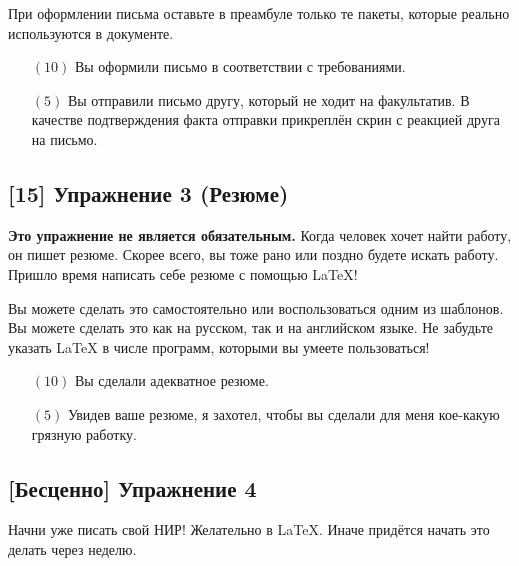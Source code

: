 \documentclass[12pt, a4paper, oneside]{article}
\begin{document}
При оформлении письма оставьте в преамбуле только те пакеты, которые реально используются в документе.

\begin{itemize}
\item[$(10)$] Вы оформили письмо в соответствии с требованиями.

\item[$(5)$] Вы отправили письмо другу, который не ходит на факультатив. В качестве подтверждения факта отправки прикреплён скрин с реакцией друга на письмо.
\end{itemize}


\subsection*{[15]  Упражнение 3 (Резюме)}

\textbf{Это упражнение не является обязательным.}  Когда человек хочет найти работу, он пишет резюме. Скорее всего, вы тоже рано или поздно будете искать работу. Пришло время написать себе резюме с помощью \LaTeX{}!

Вы можете сделать это самостоятельно или воспользоваться одним из шаблонов. Вы можете сделать это как на русском, так и на английском языке. Не забудьте указать  \LaTeX{} в числе программ, которыми вы умеете пользоваться!

\begin{itemize}
\item[$(10)$] Вы сделали адекватное резюме.
\item[$(5)$] Увидев ваше резюме, я захотел, чтобы вы сделали для меня кое-какую грязную работку.
\end{itemize}


\subsection*{ [Бесценно]  Упражнение 4}

Начни уже писать свой НИР! Желательно в  \LaTeX.  Иначе придётся начать это делать через неделю. 
\end{document}
